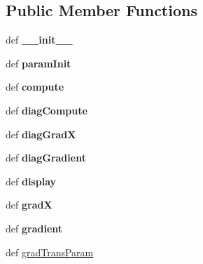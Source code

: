 \subsection*{Public Member Functions}
\begin{CompactItemize}
\item 
\hypertarget{classkern_1_1kern_55d1483588ace67fd1b3970e1a0ea80b}{
def \textbf{\_\-\_\-init\_\-\_\-}}
\label{classkern_1_1kern_55d1483588ace67fd1b3970e1a0ea80b}

\item 
\hypertarget{classkern_1_1kern_67eee7dd2cf11636e142cece9b82c051}{
def \textbf{paramInit}}
\label{classkern_1_1kern_67eee7dd2cf11636e142cece9b82c051}

\item 
\hypertarget{classkern_1_1kern_6adf6289e897a16d21fa4e3f8dda8a97}{
def \textbf{compute}}
\label{classkern_1_1kern_6adf6289e897a16d21fa4e3f8dda8a97}

\item 
\hypertarget{classkern_1_1kern_5aad6a43fd5c2ed47da04ae0cab41e99}{
def \textbf{diagCompute}}
\label{classkern_1_1kern_5aad6a43fd5c2ed47da04ae0cab41e99}

\item 
\hypertarget{classkern_1_1kern_5a842b523ae8865ce8b1d7e36997343d}{
def \textbf{diagGradX}}
\label{classkern_1_1kern_5a842b523ae8865ce8b1d7e36997343d}

\item 
\hypertarget{classkern_1_1kern_b20b45325bddf066aaf5f1411565f149}{
def \textbf{diagGradient}}
\label{classkern_1_1kern_b20b45325bddf066aaf5f1411565f149}

\item 
\hypertarget{classkern_1_1kern_a0741b54137bf1cbd0aaa85eddcdafcd}{
def \textbf{display}}
\label{classkern_1_1kern_a0741b54137bf1cbd0aaa85eddcdafcd}

\item 
\hypertarget{classkern_1_1kern_c02153c376570b309adceb57110b66c5}{
def \textbf{gradX}}
\label{classkern_1_1kern_c02153c376570b309adceb57110b66c5}

\item 
\hypertarget{classkern_1_1kern_d1a34219fcedf12482207994badde4f5}{
def \textbf{gradient}}
\label{classkern_1_1kern_d1a34219fcedf12482207994badde4f5}

\item 
def \hyperlink{classkern_1_1kern_9cd784d93e47e96eeceda8eecf1be2db}{gradTransParam}
\end{CompactItemize}
